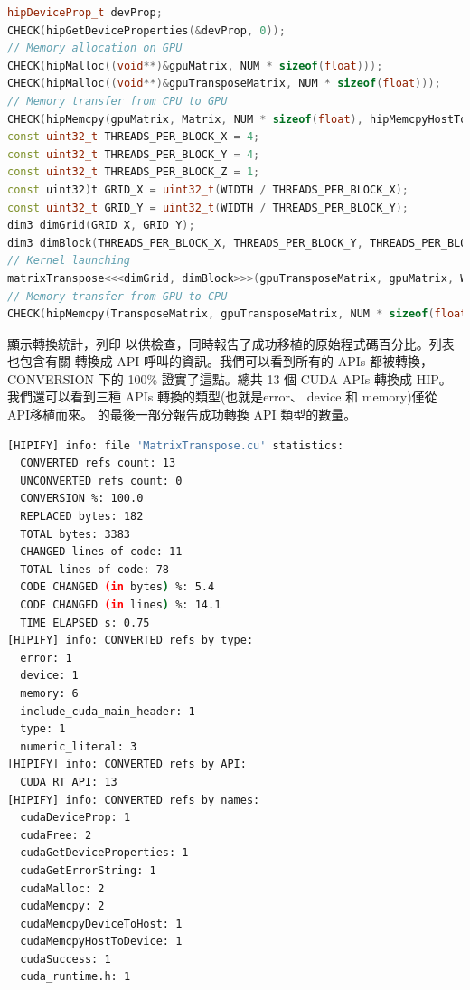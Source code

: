 \begin{lstlisting}[language=C++, caption={Hipified 矩陣轉置範例片段}, label={lst:Hipified matrix-transpose example snippet}]
hipDeviceProp_t devProp;
CHECK(hipGetDeviceProperties(&devProp, 0));
// Memory allocation on GPU
CHECK(hipMalloc((void**)&gpuMatrix, NUM * sizeof(float)));
CHECK(hipMalloc((void**)&gpuTransposeMatrix, NUM * sizeof(float)));
// Memory transfer from CPU to GPU
CHECK(hipMemcpy(gpuMatrix, Matrix, NUM * sizeof(float), hipMemcpyHostToDevice));
const uint32_t THREADS_PER_BLOCK_X = 4;
const uint32_t THREADS_PER_BLOCK_Y = 4;
const uint32_t THREADS_PER_BLOCK_Z = 1;
const uint32)t GRID_X = uint32_t(WIDTH / THREADS_PER_BLOCK_X);
const uint32_t GRID_Y = uint32_t(WIDTH / THREADS_PER_BLOCK_Y);
dim3 dimGrid(GRID_X, GRID_Y);
dim3 dimBlock(THREADS_PER_BLOCK_X, THREADS_PER_BLOCK_Y, THREADS_PER_BLOCK_Z);
// Kernel launching
matrixTranspose<<<dimGrid, dimBlock>>>(gpuTransposeMatrix, gpuMatrix, WIDTH);
// Memory transfer from GPU to CPU
CHECK(hipMemcpy(TransposeMatrix, gpuTransposeMatrix, NUM * sizeof(float), hipMemcpyDeviceToHost));
\end{lstlisting}

 顯示轉換統計，列印  以供檢查，同時報告了成功移植的原始程式碼百分比。列表也包含有關  轉換成  API 呼叫的資訊。我們可以看到所有的 APIs 都被轉換，CONVERSION 下的 100\% 證實了這點。總共 13 個 CUDA APIs 轉換成 HIP。我們還可以看到三種 APIs 轉換的類型(也就是error、 device 和 memory)僅從 API移植而來。 的最後一部分報告成功轉換 API 類型的數量。

\begin{lstlisting}[language=bash, caption={矩陣轉置HIP的轉換統計數據}, label={lst:Matrix-transpose HIP conversion statistics}]
[HIPIFY] info: file 'MatrixTranspose.cu' statistics:
  CONVERTED refs count: 13
  UNCONVERTED refs count: 0
  CONVERSION %: 100.0
  REPLACED bytes: 182
  TOTAL bytes: 3383
  CHANGED lines of code: 11
  TOTAL lines of code: 78
  CODE CHANGED (in bytes) %: 5.4
  CODE CHANGED (in lines) %: 14.1
  TIME ELAPSED s: 0.75
[HIPIFY] info: CONVERTED refs by type:
  error: 1
  device: 1
  memory: 6
  include_cuda_main_header: 1
  type: 1
  numeric_literal: 3
[HIPIFY] info: CONVERTED refs by API:
  CUDA RT API: 13
[HIPIFY] info: CONVERTED refs by names:
  cudaDeviceProp: 1
  cudaFree: 2
  cudaGetDeviceProperties: 1
  cudaGetErrorString: 1
  cudaMalloc: 2
  cudaMemcpy: 2
  cudaMemcpyDeviceToHost: 1
  cudaMemcpyHostToDevice: 1
  cudaSuccess: 1
  cuda_runtime.h: 1
\end{lstlisting}

